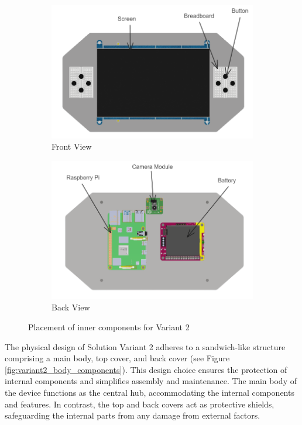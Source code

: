 \begin{figure}[ht!]
    \centering
    \begin{subfigure}[c]{0.5\textwidth}
        \begin{minipage}{\textwidth}
            \centering
            \includegraphics[height=4 cm]{texs/Part1/chapter4/image/v25.png}
        \end{minipage}
        \caption{Front View}
        \label{fig:variant2_front_view_main}
    \end{subfigure}
    \begin{subfigure}[c]{0.5\textwidth}
        \begin{minipage}{\textwidth}
            \centering
            \includegraphics[height=4 cm]{texs/Part1/chapter4/image/v26.png}
        \end{minipage}
        \caption{Back View}
        \label{fig:variant2_back_view_main}
    \end{subfigure}
    \caption{Placement of inner components for Variant 2}
    \label{fig:variant2_inner_components}
\end{figure}

The physical design of Solution Variant 2 adheres to a sandwich-like structure comprising a main body, top cover, and back cover (see Figure \ref{fig:variant2_body_components}). This design choice ensures the protection of internal components and simplifies assembly and maintenance. The main body of the device functions as the central hub, accommodating the internal components and features. In contrast, the top and back covers act as protective shields, safeguarding the internal parts from any damage from external factors.

